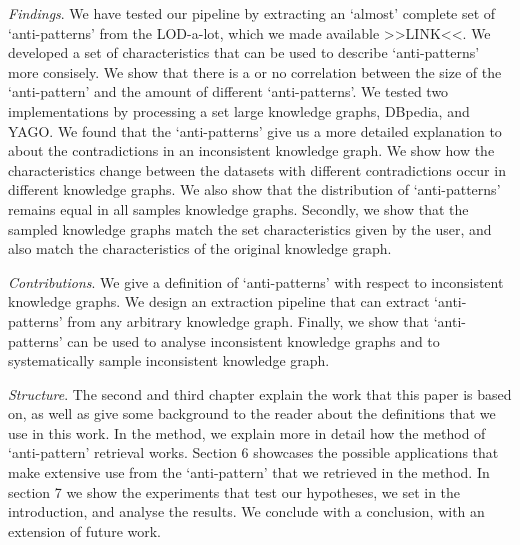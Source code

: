 \documentclass{article}
\begin{document}
\textit{Findings}. We have tested our pipeline by extracting an `almost' complete set of `anti-patterns' from the LOD-a-lot\cite{JavierD:2017}, which we made available >>LINK<<. We developed a set of characteristics that can be used to describe `anti-patterns' more consisely. 
We show that there is a or no correlation between the size of the `anti-pattern' and the amount of different `anti-patterns'. 
We tested two implementations by processing a set large knowledge graphs, DBpedia\cite{DBpedia}, and YAGO\cite{YAGO}.
We found that the `anti-patterns' give us a more detailed explanation to about the contradictions in an inconsistent knowledge graph. 
We show how the characteristics change between the datasets with different contradictions occur in different knowledge graphs. We also show that the  distribution of `anti-patterns' remains equal in all samples knowledge graphs. 
Secondly, we show that the sampled knowledge graphs match the set characteristics given by the user, and also match the characteristics of the original knowledge graph.

\textit{Contributions}. We give a definition of `anti-patterns' with respect to inconsistent knowledge graphs. We design an extraction pipeline that can extract `anti-patterns' from any arbitrary knowledge graph. Finally, we show that `anti-patterns' can be used to analyse inconsistent knowledge graphs and to systematically sample inconsistent knowledge graph.

\textit{Structure}. The second and third chapter explain the work that this paper is based on, as well as give some background to the reader about the definitions that we use in this work. In the method, we explain more in detail how the method of `anti-pattern' retrieval works. Section 6  showcases the possible applications that make extensive use from the `anti-pattern' that we retrieved in the method. In section 7 we show the experiments that test our hypotheses, we set in the introduction, and analyse the results. We conclude with a conclusion, with an extension of future work.

\newpage
\end{document}
